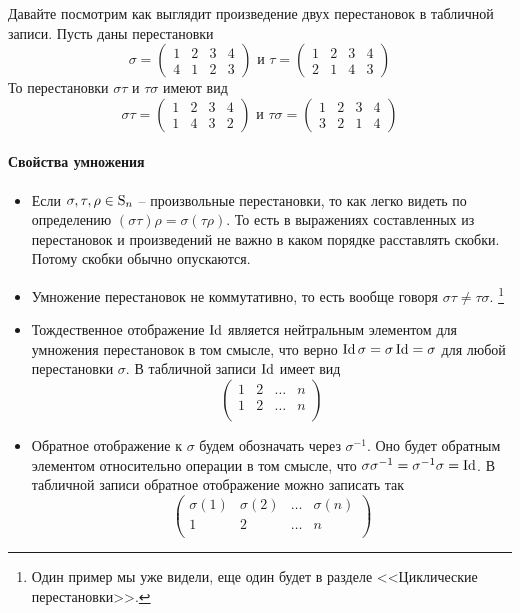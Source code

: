 Давайте посмотрим как выглядит произведение двух перестановок в табличной записи.
Пусть даны перестановки
\[
\sigma = 
\begin{pmatrix}
{1}&{2}&{3}&{4}\\
{4}&{1}&{2}&{3}
\end{pmatrix}\text{ и }
\tau = 
\begin{pmatrix}
{1}&{2}&{3}&{4}\\
{2}&{1}&{4}&{3}
\end{pmatrix}
\]
То перестановки $\sigma \tau$ и $\tau\sigma$ имеют вид
\[
\sigma \tau= 
\begin{pmatrix}
{1}&{2}&{3}&{4}\\
{1}&{4}&{3}&{2}
\end{pmatrix}\text{ и }
\tau \sigma= 
\begin{pmatrix}
{1}&{2}&{3}&{4}\\
{3}&{2}&{1}&{4}
\end{pmatrix}
\]

\paragraph{Свойства умножения}

\begin{itemize}
\item Если $\sigma, \tau, \rho \in\operatorname{S}_{n}$ -- произвольные перестановки, то как легко видеть по определению $(\sigma\tau)\rho = \sigma(\tau\rho)$.
То есть в выражениях составленных из перестановок и произведений не важно в каком порядке расставлять скобки.
Потому скобки обычно опускаются.

\item Умножение перестановок не коммутативно, то есть вообще говоря $\sigma\tau \neq \tau \sigma$.%
\footnote{Один пример мы уже видели, еще один будет в разделе <<Циклические перестановки>>.} 

\item Тождественное отображение $\operatorname{Id}$ является нейтральным элементом для умножения перестановок в том смысле, что верно $\operatorname{Id} \sigma = \sigma \operatorname{Id} = \sigma$ для любой перестановки $\sigma$.
В табличной записи $\operatorname{Id}$ имеет вид
\[
\begin{pmatrix}
{1}&{2}&{\ldots}&{n}\\
{1}&{2}&{\ldots}&{n}\\
\end{pmatrix}
\]

\item Обратное отображение к $\sigma$ будем обозначать через $\sigma^{-1}$.
Оно будет обратным элементом относительно операции в том смысле, что $\sigma \sigma^{-1} = \sigma^{-1}\sigma = \operatorname{Id}$.
В табличной записи обратное отображение можно записать так
\[
\begin{pmatrix}
{\sigma(1)}&{\sigma(2)}&{\ldots}&{\sigma(n)}\\
{1}&{2}&{\ldots}&{n}\\
\end{pmatrix}
\]
\end{itemize}

